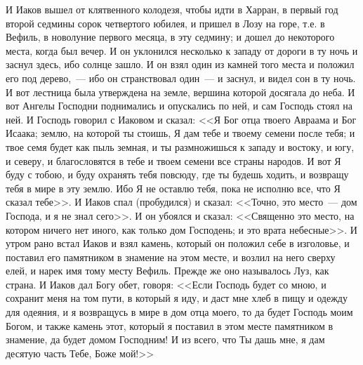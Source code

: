 И Иаков вышел от клятвенного колодезя, чтобы
идти в Харран, в первый год второй седмины сорок
четвертого юбилея, и пришел в Лозу на горе, т.е. в
Вефиль, в новолуние первого месяца, в эту седмину;
и дошел до некоторого места, когда был вечер.
И он уклонился несколько к западу от дороги в ту
ночь и заснул здесь, ибо солнце зашло. И он взял
один из камней того места и положил его под
дерево,~--- ибо он странствовал один~--- и заснул, и
видел сон в ту ночь. И вот лестница была
утверждена на земле, вершина которой досягала до
неба. И вот Ангелы Господни поднимались и
опускались по ней, и сам Господь стоял на ней. И
Господь говорил с Иаковом и сказал: <<Я Бог отца
твоего Авраама и Бог Исаака; землю, на которой ты
стоишь, Я дам тебе и твоему семени после тебя; и
твое семя будет как пыль земная, и ты
размножишься к западу и востоку, и югу, и северу, и
благословятся в тебе и твоем семени все страны
народов. И вот Я буду с тобою, и буду охранять тебя
повсюду, где ты будешь ходить, и возвращу тебя в
мире в эту землю. Ибо Я не оставлю тебя, пока не
исполню все, что Я сказал тебе>>. И Иаков спал
(пробудился) и сказал: <<Точно, это место~--- дом
Господа, и я не знал сего>>. И он убоялся и
сказал: <<Священно это место, на котором ничего
нет иного, как только дом Господень; и это врата
небесные>>. И утром рано встал Иаков и взял
камень, который он положил себе в изголовье, и
поставил его памятником в знамение на этом месте,
и возлил на него сверху елей, и нарек имя тому
месту Вефиль. Прежде же оно называлось Луз, как
страна. И Иаков дал Богу обет, говоря: <<Если
Господь будет со мною, и сохранит меня на том
пути, в который я иду, и даст мне хлеб в пищу и
одежду для одеяния, и я возвращусь в мире в
дом отца моего, то да будет Господь моим Богом, и
также камень этот, который я поставил в этом
месте памятником в знамение, да будет домом
Господним! И из всего, что Ты дашь мне, я дам
десятую часть Тебе, Боже мой!>>

